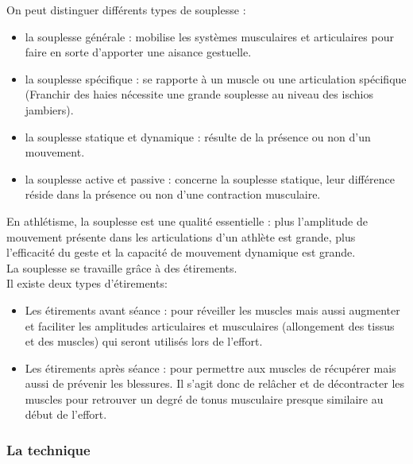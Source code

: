          On peut distinguer différents types de souplesse :
         \begin{itemize}
             \item la souplesse générale : mobilise les systèmes musculaires et articulaires pour faire en sorte d’apporter une aisance gestuelle.
             \item la souplesse spécifique : se rapporte à un muscle ou une articulation spécifique (Franchir des haies nécessite une grande souplesse au niveau des ischios jambiers).
             \item la souplesse statique et dynamique : résulte de la présence ou non d’un mouvement.
             \item la souplesse active et passive : concerne la souplesse statique, leur différence réside dans la présence ou non d’une contraction musculaire.\\
         \end{itemize}

        En athlétisme, la souplesse est une qualité essentielle : 
        plus l'amplitude de mouvement présente dans les articulations d'un athlète est grande, plus l’efficacité du geste et la capacité de mouvement dynamique est grande.\\

        La souplesse se travaille grâce à des étirements.\\
        
        Il existe deux types d'étirements: 
        \begin{itemize}
            \item Les étirements avant séance :  pour réveiller les muscles mais aussi augmenter et faciliter les amplitudes articulaires et musculaires (allongement des tissus et des muscles) qui seront utilisés lors de l'effort.
            \item Les étirements après séance : pour permettre aux muscles de récupérer mais aussi de prévenir les blessures.
            Il s’agit donc de relâcher et de décontracter les muscles pour retrouver un degré de tonus musculaire presque similaire au début de l’effort.
        \end{itemize}
                
            
        \vspace{10pt}
            
            
        \subsubsection{La technique}
        

